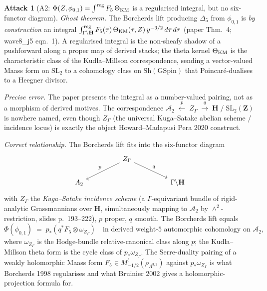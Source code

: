 \documentclass[11pt]{amsart}
\theoremstyle{definition}
\newtheorem{attack}{Attack}
\providecommand{\Sh}{\mathrm{Sh}}
\providecommand{\GSpin}{\mathrm{GSpin}}
\providecommand{\SL}{\mathrm{SL}}
\providecommand{\bZ}{\mathbf{Z}}
\providecommand{\bH}{\mathbf{H}}
\providecommand{\Dfive}{\Delta_5}
\begin{document}
\begin{attack}[A2: $\Phi(Z, \phi_{0,1}) = \int^{\rm reg} F_5\,
\Theta_{\rm KM}$ is a regularised integral, but no six-functor
diagram]\leavevmode

\noindent\emph{Ghost theorem.} The Borcherds lift producing $\Dfive$
from $\phi_{0,1}$ is \emph{by construction} an integral
$\int^{\rm reg}_{\Gamma \backslash \bH} F_5(\tau)\,
\Theta_{\rm KM}(\tau, Z)\, y^{-3/2}\,d\tau\,d\bar\tau$ (paper Thm.~4;
wave8\_j5 eqn.~1). A regularised integral is the non-sheafy shadow
of a pushforward along a proper map of derived stacks; the
theta kernel $\Theta_{\rm KM}$ is the characteristic class of the
Kudla--Millson correspondence, sending a vector-valued Maass form on
$\SL_2$ to a cohomology class on $\Sh(\GSpin)$ that Poincar\'e-dualises
to a Heegner divisor.

\noindent\emph{Precise error.} The paper presents the integral as a
number-valued pairing, not as a morphism of derived motives. The
correspondence
$\mathcal{A}_2 \;\xleftarrow{p}\; Z_\Gamma \;\xrightarrow{q}\; \bH
\;/\;\SL_2(\bZ)$ is nowhere named, even though $Z_\Gamma$ (the
universal Kuga--Satake abelian scheme / incidence locus) is
exactly the object Howard--Madapusi Pera 2020 construct.

\noindent\emph{Correct relationship.} The Borcherds lift fits into
the six-functor diagram
\[
\begin{tikzcd}[column sep=huge]
 & Z_\Gamma \ar[dl, "p"'] \ar[dr, "q"] & \\
 \mathcal{A}_2 & & \Gamma \backslash \bH
\end{tikzcd}
\]
with $Z_\Gamma$ the \emph{Kuga--Satake incidence scheme} (a
$\Gamma$-equivariant bundle of rigid-analytic Grassmannians over
$\bH$, simultaneously mapping to $\mathcal{A}_2$ by
$\wedge^2$-restriction, slides p.~193--222), $p$ proper, $q$ smooth.
The Borcherds lift equals
\[
 \Phi(\phi_{0,1}) \;=\; p_* (q^* F_5 \otimes \omega_{Z_\Gamma})
 \quad\text{in derived weight-$5$ automorphic cohomology on
 $\mathcal{A}_2$,}
\]
where $\omega_{Z_\Gamma}$ is the Hodge-bundle relative-canonical class
along $p$; the Kudla--Millson theta form is the cycle class of
$p_*\omega_{Z_\Gamma}$. The Serre-duality pairing of a weakly
holomorphic Maass form $F_5 \in M^!_{-1/2}(\rho_{\Lambda^{3,2}})$
against $p_*\omega_{Z_\Gamma}$ is what Borcherds 1998 regularises and
what Bruinier 2002 gives a holomorphic-projection formula for.
\end{attack}
\end{document}
